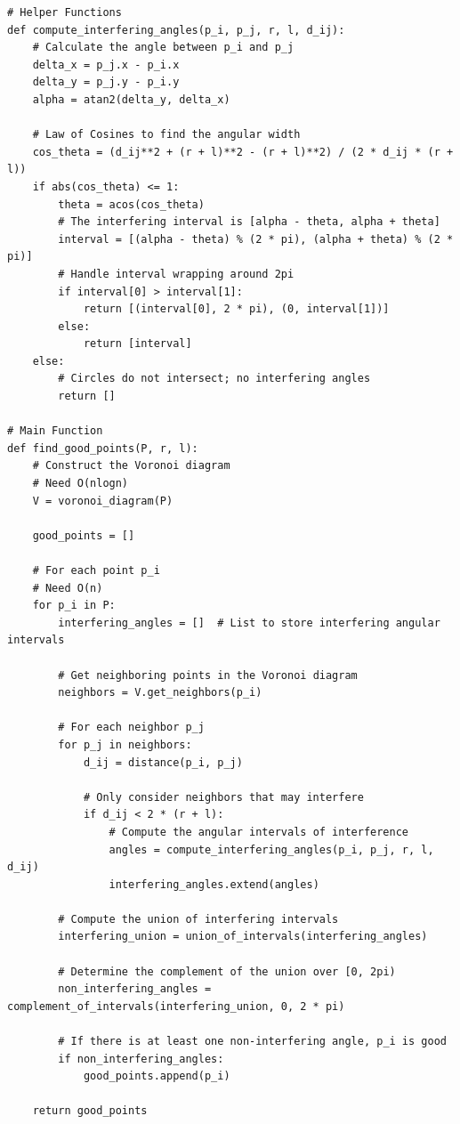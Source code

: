 \documentclass{article}
\begin{document}
\begin{verbatim}
# Helper Functions
def compute_interfering_angles(p_i, p_j, r, l, d_ij):
    # Calculate the angle between p_i and p_j
    delta_x = p_j.x - p_i.x
    delta_y = p_j.y - p_i.y
    alpha = atan2(delta_y, delta_x)

    # Law of Cosines to find the angular width
    cos_theta = (d_ij**2 + (r + l)**2 - (r + l)**2) / (2 * d_ij * (r + l))
    if abs(cos_theta) <= 1:
        theta = acos(cos_theta)
        # The interfering interval is [alpha - theta, alpha + theta]
        interval = [(alpha - theta) % (2 * pi), (alpha + theta) % (2 * pi)]
        # Handle interval wrapping around 2pi
        if interval[0] > interval[1]:
            return [(interval[0], 2 * pi), (0, interval[1])]
        else:
            return [interval]
    else:
        # Circles do not intersect; no interfering angles
        return []

# Main Function
def find_good_points(P, r, l):
    # Construct the Voronoi diagram
    # Need O(nlogn)
    V = voronoi_diagram(P)

    good_points = []

    # For each point p_i
    # Need O(n)
    for p_i in P:
        interfering_angles = []  # List to store interfering angular intervals

        # Get neighboring points in the Voronoi diagram
        neighbors = V.get_neighbors(p_i)

        # For each neighbor p_j
        for p_j in neighbors:
            d_ij = distance(p_i, p_j)

            # Only consider neighbors that may interfere
            if d_ij < 2 * (r + l):
                # Compute the angular intervals of interference
                angles = compute_interfering_angles(p_i, p_j, r, l, d_ij)
                interfering_angles.extend(angles)

        # Compute the union of interfering intervals
        interfering_union = union_of_intervals(interfering_angles)

        # Determine the complement of the union over [0, 2pi)
        non_interfering_angles = complement_of_intervals(interfering_union, 0, 2 * pi)

        # If there is at least one non-interfering angle, p_i is good
        if non_interfering_angles:
            good_points.append(p_i)

    return good_points
\end{verbatim}
\end{document}
